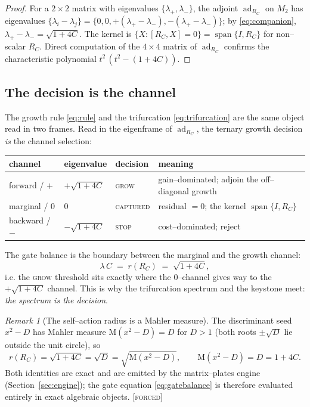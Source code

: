 \documentclass[11pt]{article}
\theoremstyle{plain}
\theoremstyle{definition}
\theoremstyle{remark}
\newtheorem{remark}[theorem]{Remark}
\newcommand{\forced}{\textcolor{forcedc}{\textsc{[forced]}}}
\newcommand{\Mah}{\mathrm{M}}
\begin{document}
\begin{proof}
For a $2\times2$ matrix with eigenvalues $\{\lambda_+,\lambda_-\}$, the adjoint $\operatorname{ad}_{R_C}$ on $M_2$ has eigenvalues $\{\lambda_i-\lambda_j\}=\{0,0,+(\lambda_+-\lambda_-),-(\lambda_+-\lambda_-)\}$; by \eqref{eq:companion}, $\lambda_+-\lambda_-=\sqrt{1+4C}$. The kernel is $\{X:[R_C,X]=0\}=\operatorname{span}\{I,R_C\}$ for non--scalar $R_C$. Direct computation of the $4\times4$ matrix of $\operatorname{ad}_{R_C}$ confirms the characteristic polynomial $t^2\,(t^2-(1+4C))$.
\end{proof}

\subsection{The decision is the channel}

The growth rule \eqref{eq:rule} and the trifurcation \eqref{eq:trifurcation} are the same object read in two frames. Read in the eigenframe of $\operatorname{ad}_{R_C}$, the ternary growth decision \emph{is} the channel selection:

\begin{center}
\renewcommand{\arraystretch}{1.3}
\begin{tabular}{@{}llll@{}}
\toprule
channel & eigenvalue & decision & meaning \\
\midrule
forward / $+$ & $+\sqrt{1+4C}$ & \textsc{grow} & gain--dominated; adjoin the off--diagonal growth \\
marginal / $0$ & $0$ & \textsc{captured} & residual $=0$; the kernel $\operatorname{span}\{I,R_C\}$ \\
backward / $-$ & $-\sqrt{1+4C}$ & \textsc{stop} & cost--dominated; reject \\
\bottomrule
\end{tabular}
\end{center}

\noindent The gate balance is the boundary between the marginal and the growth channel:
\begin{equation}\label{eq:gatebalance}
\lambda\, C \;=\; r(R_C) \;=\; \sqrt{1+4C},
\end{equation}
i.e. the \textsc{grow} threshold sits exactly where the $0$--channel gives way to the $+\sqrt{1+4C}$ channel. This is why the trifurcation spectrum and the keystone meet: \emph{the spectrum is the decision}.

\begin{remark}[The self--action radius is a Mahler measure]\label{rem:mahler}
The discriminant seed $x^2-D$ has Mahler measure $\Mah(x^2-D)=D$ for $D>1$ (both roots $\pm\sqrt D$ lie outside the unit circle), so
\begin{equation}\label{eq:rmahler}
r(R_C) = \sqrt{1+4C} = \sqrt{D} = \sqrt{\Mah(x^2-D)}, \qquad \Mah(x^2-D)=D=1+4C.
\end{equation}
Both identities are exact and are emitted by the matrix--plates engine (Section~\ref{sec:engine}); the gate equation \eqref{eq:gatebalance} is therefore evaluated entirely in exact algebraic objects. \forced
\end{remark}
\end{document}
